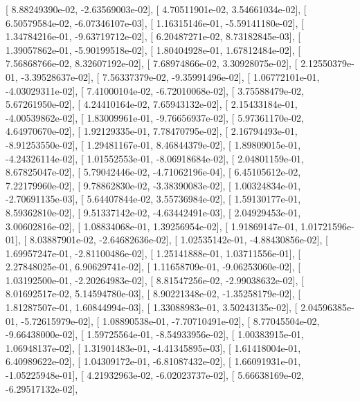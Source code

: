 \documentclass{article}
\begin{document}
       [  8.88249390e-02,  -2.63569003e-02],
       [  4.70511901e-02,   3.54661034e-02],
       [  6.50579584e-02,  -6.07346107e-03],
       [  1.16315146e-01,  -5.59141180e-02],
       [  1.34784216e-01,  -9.63719712e-02],
       [  6.20487271e-02,   8.73182845e-03],
       [  1.39057862e-01,  -5.90199518e-02],
       [  1.80404928e-01,   1.67812484e-02],
       [  7.56868766e-02,   8.32607192e-02],
       [  7.68974866e-02,   3.30928075e-02],
       [  2.12550379e-01,  -3.39528637e-02],
       [  7.56337379e-02,  -9.35991496e-02],
       [  1.06772101e-01,  -4.03029311e-02],
       [  7.41000104e-02,  -6.72010068e-02],
       [  3.75588479e-02,   5.67261950e-02],
       [  4.24410164e-02,   7.65943132e-02],
       [  2.15433184e-01,  -4.00539862e-02],
       [  1.83009961e-01,  -9.76656937e-02],
       [  5.97361170e-02,   4.64970670e-02],
       [  1.92129335e-01,   7.78470795e-02],
       [  2.16794493e-01,  -8.91253550e-02],
       [  1.29481167e-01,   8.46844379e-02],
       [  1.89809015e-01,  -4.24326114e-02],
       [  1.01552553e-01,  -8.06918684e-02],
       [  2.04801159e-01,   8.67825047e-02],
       [  5.79042446e-02,  -4.71062196e-04],
       [  6.45105612e-02,   7.22179960e-02],
       [  9.78862830e-02,  -3.38390083e-02],
       [  1.00324834e-01,  -2.70691135e-03],
       [  5.64407844e-02,   3.55736984e-02],
       [  1.59130177e-01,   8.59362810e-02],
       [  9.51337142e-02,  -4.63442491e-03],
       [  2.04929453e-01,   3.00602816e-02],
       [  1.08834068e-01,   1.39256954e-02],
       [  1.91869147e-01,   1.01721596e-01],
       [  8.03887901e-02,  -2.64682636e-02],
       [  1.02535142e-01,  -4.88430856e-02],
       [  1.69957247e-01,  -2.81100486e-02],
       [  1.25141888e-01,   1.03711556e-01],
       [  2.27848025e-01,   6.90629741e-02],
       [  1.11658709e-01,  -9.06253060e-02],
       [  1.03192500e-01,  -2.20264983e-02],
       [  8.81547256e-02,  -2.99038632e-02],
       [  8.01692517e-02,   5.14594780e-03],
       [  8.90221348e-02,  -1.35258179e-02],
       [  1.81287507e-01,   1.60844994e-03],
       [  1.33088983e-01,   3.50243135e-02],
       [  2.04596385e-01,  -5.72615979e-02],
       [  1.08890538e-01,  -7.70710491e-02],
       [  8.77045504e-02,  -9.66438000e-02],
       [  1.59725564e-01,  -8.54933956e-02],
       [  1.00383915e-01,   1.06948137e-02],
       [  1.31901483e-01,  -4.41345895e-03],
       [  1.61418004e-01,   6.40989622e-02],
       [  1.04309172e-01,  -6.81087432e-02],
       [  1.66091931e-01,  -1.05225948e-01],
       [  4.21932963e-02,  -6.02023737e-02],
       [  5.66638169e-02,  -6.29517132e-02],
\end{document}

